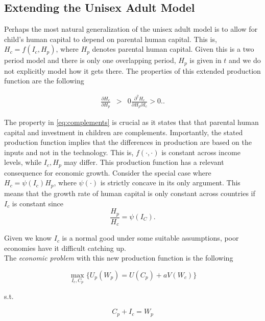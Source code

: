 \subsection{Extending the Unisex Adult Model} \label{sec:extending}

\noindent Perhaps the most natural generalization of the unisex adult model is to allow for child's human capital to depend on parental human capital. This is, $H_{c} = f (I_{c}, H_{p})$, where $H_{p}$ denotes parental human capital. Given this is a two period model and there is only one overlapping period, $H_{p}$ is given in $t$ and we do not explicitly model how it gets there. The properties of this extended production function are the following

\begin{eqnarray}
\frac{\partial H_{c}}{\partial H_{p}} &>& 0
\frac{\partial^2 H_{c}}{\partial H_{p} \partial I_{c}} > 0. \label{eq:complements}. 
\end{eqnarray}

\indent The property in \eqref{eq:complements} is crucial as it states that that parental human capital and investment in children are complements. Importantly, the stated production function implies that the differences in production are based on the inputs and not in the technology. This is, $f(\cdot, \cdot)$ is constant across income levels, while $I_{c}, H_{p}$ may differ. This production function has a relevant consequence for economic growth. Consider the special case where $H_{c} = \psi (I_{c}) H_{p}$, where $\psi (\cdot)$ is strictly concave in its only argument. This means that the growth rate of human capital is only constant across countries if $I_{c}$ is constant since
\begin{equation}
\frac{H_{p}}{H_{c}} = \psi(I_{C}). 
\end{equation}

\noindent Given we know $I_{c}$ is a normal good under some suitable assumptions, poor economies have it difficult catching up.\\
\indent The \textit{economic problem} with this new production function is the following

\begin{equation}
\max_{I_{c}, C_{p}} \{ U_{p} (W_{p}) = U(C_{p}) + a V(W_{c}) \}
\end{equation}  

\noindent s.t.

\begin{equation}
C_{p} + I_{c} = W_{p} \label{eq:constraint1}
\end{equation}

